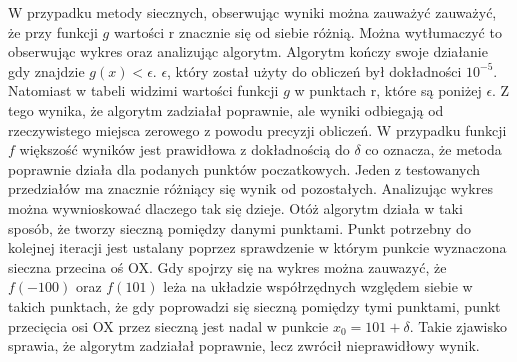 \documentclass[11pt, a4paper]{article}
\begin{document}
     W przypadku metody siecznych, obserwując wyniki można zauważyć zauważyć, że przy funkcji $g$ wartości r znacznie się od siebie różnią. Można wytłumaczyć to obserwując wykres oraz analizując algorytm. Algorytm kończy swoje działanie gdy znajdzie $g(x) < \epsilon$. $\epsilon$, który został użyty do obliczeń był dokładności $10^{-5}$. Natomiast w tabeli widzimi wartości funkcji $g$ w punktach r, które są poniżej $\epsilon$. Z tego wynika, że algorytm zadziałał poprawnie, ale wyniki odbiegają od rzeczywistego miejsca zerowego z powodu precyzji obliczeń. W przypadku funkcji $f$ większość wyników jest prawidłowa z dokładnością do $\delta$ co oznacza, że metoda poprawnie działa dla podanych punktów poczatkowych. Jeden z testowanych przedziałów ma znacznie różniący się wynik od pozostałych. Analizując wykres można wywnioskować dlaczego tak się dzieje. Otóż algorytm działa w taki sposób, że tworzy sieczną pomiędzy danymi punktami. Punkt potrzebny do kolejnej iteracji jest ustalany poprzez sprawdzenie w którym punkcie wyznaczona sieczna przecina oś OX. Gdy spojrzy się na wykres można zauwazyć, że $f(-100)$ oraz $f(101)$ leża na układzie współrzędnych względem siebie w takich punktach, że gdy poprowadzi się sieczną pomiędzy tymi punktami, punkt przecięcia osi OX przez sieczną jest nadal w punkcie $x_{0} = 101 + \delta$. Takie zjawisko sprawia, że algorytm zadziałał poprawnie, lecz zwrócił nieprawidłowy wynik.
\end{document}
